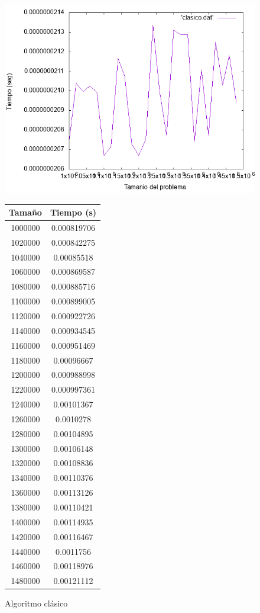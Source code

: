 \documentclass[12pt,spanish]{article}
\begin{document}
\begin{figure}[H]
\centering

\includegraphics[scale=0.75]{clasico.png}
\vskip 0.5cm

\begin{tabular}{|c|c|}
\hline
\textbf{Tamaño} & \textbf{Tiempo (s)} \\
\hline
1000000 & 0.000819706\\
\hline
1020000 & 0.000842275\\
\hline
1040000 & 0.00085518\\
\hline
1060000 & 0.000869587\\
\hline
1080000 & 0.000885716\\
\hline
1100000 & 0.000899005\\
\hline
1120000 & 0.000922726\\
\hline
1140000 & 0.000934545\\
\hline
1160000 & 0.000951469\\
\hline
1180000 & 0.00096667\\
\hline
1200000 & 0.000988998\\
\hline
1220000 & 0.000997361\\
\hline
1240000 & 0.00101367\\
\hline
1260000 & 0.0010278\\
\hline
1280000 & 0.00104895\\
\hline
1300000 & 0.00106148\\
\hline
1320000 & 0.00108836\\
\hline
1340000 & 0.00110376\\
\hline
1360000 & 0.00113126\\
\hline
1380000 & 0.00110421\\
\hline
1400000 & 0.00114935\\
\hline
1420000 & 0.00116467\\
\hline
1440000 & 0.0011756\\
\hline
1460000 & 0.00118976\\
\hline
1480000 & 0.00121112\\
\hline

\end{tabular}


\caption{Algoritmo clásico}
\end{figure}
\end{document}
